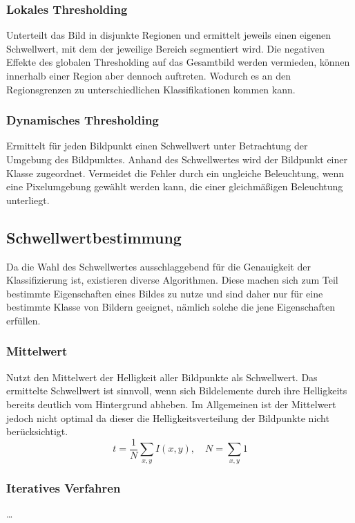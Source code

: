 \subsubsection*{Lokales Thresholding}
Unterteilt das Bild in disjunkte Regionen und ermittelt jeweils einen eigenen Schwellwert, mit dem der jeweilige Bereich segmentiert wird.
Die negativen Effekte des globalen Thresholding auf das Gesamtbild werden vermieden, können innerhalb einer Region aber dennoch auftreten.
Wodurch es an den Regionsgrenzen zu unterschiedlichen Klassifikationen kommen kann.

\subsubsection*{Dynamisches Thresholding}
Ermittelt für jeden Bildpunkt einen Schwellwert unter Betrachtung der Umgebung des Bildpunktes.
Anhand des Schwellwertes wird der Bildpunkt einer Klasse zugeordnet.
Vermeidet die Fehler durch ein ungleiche Beleuchtung, wenn eine Pixelumgebung gewählt werden kann, die einer gleichmäßigen Beleuchtung unterliegt.

\subsection*{Schwellwertbestimmung}
Da die Wahl des Schwellwertes ausschlaggebend für die Genauigkeit der Klassifizierung ist, existieren diverse Algorithmen.
Diese machen sich zum Teil bestimmte Eigenschaften eines Bildes zu nutze und sind daher nur für eine bestimmte Klasse von Bildern geeignet, nämlich solche die jene Eigenschaften erfüllen.

\subsubsection*{Mittelwert}
Nutzt den Mittelwert der Helligkeit aller Bildpunkte als Schwellwert.
Das ermittelte Schwellwert ist sinnvoll, wenn sich Bildelemente durch ihre Helligkeits bereits deutlich vom Hintergrund abheben.
Im Allgemeinen ist der Mittelwert jedoch nicht optimal da dieser die Helligkeitsverteilung der Bildpunkte nicht berücksichtigt.
  \[ t = \frac{1}{N} \sum_{x,y} I(x,y), \quad N = \sum_{x,y} 1 \]

\subsubsection*{Iteratives Verfahren}
\ldots


